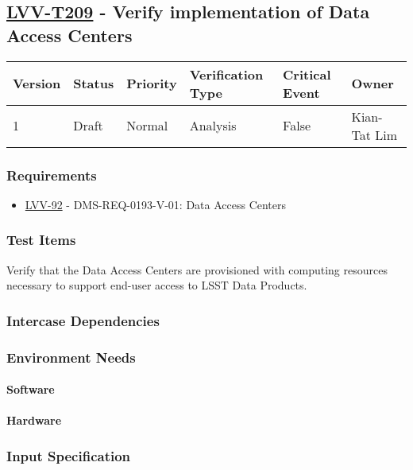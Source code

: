 \subsection{\href{https://jira.lsstcorp.org/secure/Tests.jspa\#/testCase/LVV-T209}{LVV-T209}
    - Verify implementation of Data Access Centers}\label{lvv-t209}

\begin{longtable}[]{llllll}
\toprule
Version & Status & Priority & Verification Type & Critical Event & Owner
\\\midrule
1 & Draft & Normal &
Analysis & False & Kian-Tat Lim
\\\bottomrule
\end{longtable}

\subsubsection{Requirements}
\begin{itemize}
\item \href{https://jira.lsstcorp.org/browse/LVV-92}{LVV-92} - DMS-REQ-0193-V-01: Data Access Centers
\end{itemize}

\subsubsection{Test Items}
Verify that the Data Access Centers are provisioned with computing
resources necessary to support end-user access to LSST Data Products.



\subsubsection{Intercase Dependencies}

\subsubsection{Environment Needs}

\paragraph{Software}

\paragraph{Hardware}

\subsubsection{Input Specification}

